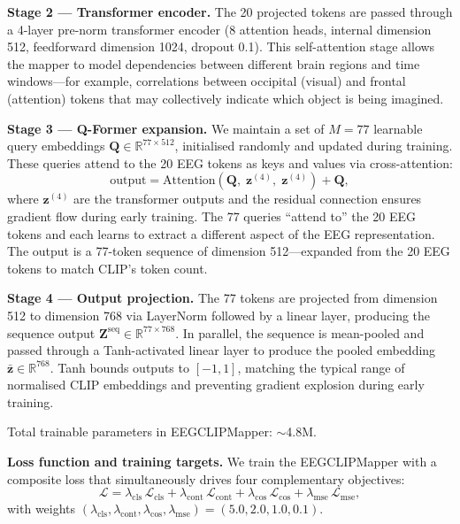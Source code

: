 \documentclass{article}
\begin{document}
\textbf{Stage 2 --- Transformer encoder.} The 20 projected tokens are passed through a 4-layer pre-norm transformer encoder (8 attention heads, internal dimension 512, feedforward dimension 1024, dropout 0.1). This self-attention stage allows the mapper to model dependencies between different brain regions and time windows---for example, correlations between occipital (visual) and frontal (attention) tokens that may collectively indicate which object is being imagined.

\textbf{Stage 3 --- Q-Former expansion.} We maintain a set of $M=77$ learnable query embeddings $\mathbf{Q} \in \mathbb{R}^{77 \times 512}$, initialised randomly and updated during training. These queries attend to the 20 EEG tokens as keys and values via cross-attention:
\[
\text{output} = \text{Attention}(\mathbf{Q},\; \mathbf{z}^{(4)},\; \mathbf{z}^{(4)}) + \mathbf{Q},
\]
where $\mathbf{z}^{(4)}$ are the transformer outputs and the residual connection ensures gradient flow during early training. The 77 queries ``attend to'' the 20 EEG tokens and each learns to extract a different aspect of the EEG representation. The output is a 77-token sequence of dimension 512---expanded from the 20 EEG tokens to match CLIP's token count.

\textbf{Stage 4 --- Output projection.} The 77 tokens are projected from dimension 512 to dimension 768 via LayerNorm followed by a linear layer, producing the sequence output $\mathbf{Z}^{\text{seq}} \in \mathbb{R}^{77 \times 768}$. In parallel, the sequence is mean-pooled and passed through a Tanh-activated linear layer to produce the pooled embedding $\bar{\mathbf{z}} \in \mathbb{R}^{768}$. Tanh bounds outputs to $[-1, 1]$, matching the typical range of normalised CLIP embeddings and preventing gradient explosion during early training.

Total trainable parameters in EEGCLIPMapper: $\sim$4.8M.

\textbf{Loss function and training targets.} We train the EEGCLIPMapper with a composite loss that simultaneously drives four complementary objectives:
\begin{equation}
  \mathcal{L} = \lambda_\mathrm{cls}\,\mathcal{L}_\mathrm{cls} + \lambda_\mathrm{cont}\,\mathcal{L}_\mathrm{cont} + \lambda_\mathrm{cos}\,\mathcal{L}_\mathrm{cos} + \lambda_\mathrm{mse}\,\mathcal{L}_\mathrm{mse},
\end{equation}
with weights $(\lambda_\mathrm{cls}, \lambda_\mathrm{cont}, \lambda_\mathrm{cos}, \lambda_\mathrm{mse}) = (5.0, 2.0, 1.0, 0.1)$.
\end{document}

